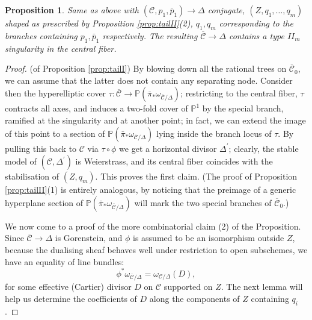 \documentclass[11pt]{amsart}
\newcommand{\PP}{\mathbb P}
\renewcommand{\to}{\rightarrow}
\newcommand{\dvr}{\Delta}
\theoremstyle{plain}
\newtheorem{prop}[thm]{Proposition}
\theoremstyle{definition}
\begin{document}
\begin{prop}\label{prop:contractionII}
 Same as above with $(\mathcal C,p_1,\bar p_1)\to \Delta$ conjugate, $(Z,q_1,\ldots,q_m)$ shaped as prescribed by Proposition \ref{prop:tailII}(2), $q_1,q_m$ corresponding to the branches containing $p_1,\bar p_1$ respectively. The resulting $\overline{\mathcal C}\to\dvr$ contains a type $I\!I_m$ singularity in the central fiber.
\end{prop}

\begin{proof}(of Proposition \ref{prop:tailI}) By blowing down all the rational trees on $\overline{\mathcal C}_0$, we can assume that the latter does not contain any separating node. Consider then the hyperelliptic cover $\tau\colon\overline{\mathcal C}\to\PP(\bar\pi_*\omega_{\overline{\mathcal C}/\dvr})$; restricting to the central fiber, $\tau$ contracts all axes, and induces a two-fold cover of $\PP^1$ by the special branch, ramified at the singularity and at another point; in fact, we can extend the image of this point to a section of $\PP(\bar\pi_*\omega_{\overline{\mathcal C}/\dvr})$ lying inside the branch locus of $\tau$. By pulling this back to $\mathcal C$ via $\tau\circ\phi$ we get a horizontal divisor $\Delta^\prime$; clearly, the stable model of $(\mathcal C,\Delta^\prime)$ is Weierstrass, and its central fiber coincides with the stabilisation of $(Z,q_m)$. This proves the first claim. (The proof of Proposition \ref{prop:tailII}(1) is entirely analogous, by noticing that the preimage of a generic hyperplane section of $\PP(\bar\pi_*\omega_{\overline{\mathcal C}/\dvr})$ will mark the two special branches of $\overline{\mathcal C}_0$.)

We now come to a proof of the more combinatorial claim (2) of the Proposition. Since $\overline{\mathcal C}\to \Delta$ is Gorenstein, and $\phi$ is assumed to be an isomorphism outside $Z$, because the dualising sheaf behaves well under restriction to open subschemes, we have an equality of line bundles:
\[ \phi^*\omega_{\overline{\mathcal C}/\dvr}=\omega_{\mathcal C/\dvr}(D),\]
for some effective (Cartier) divisor $D$ on $\mathcal C$ supported on $Z$. The next lemma will help us determine the coefficients of $D$ along the components of $Z$ containing $q_i$.


\end{proof}
\end{document}

